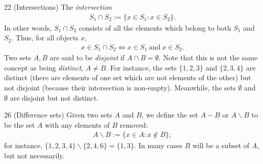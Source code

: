\begin{definition}{22}
    \label{set-intersection}
    (Intersections) The \emph{intersection} \begin{align*}
        S_1\cap S_2 := \{x\in S_1:x\in S_2\}.
    \end{align*}
    In other words, $S_1\cap S_2$ consists of all the elements which belong to both $S_1$ and $S_2$. Thus, for all objects $x$,\begin{align*}
        x\in S_1\cap S_2 \iff x\in S_1~\text{and}~x\in S_2.
    \end{align*}
    Two sets $A,B$ are said to be \emph{disjoint} if $A\cap B=\emptyset$. Note that this is not the same concept as being \emph{distinct}, $A\neq B$. For instance, the sets $\{1,2,3\}$ and $\{2,3,4\}$ are distinct (there are elements of one set which are not elements of the other) but not disjoint (because their intersection is non-empty). Meanwhile, the sets $\emptyset$ and $\emptyset$ are disjoint but not distinct.
\end{definition}

\begin{definition}{26}
    \label{set-difference}
    (Difference sets) Given two sets $A$ and $B$, we define the set $A-B$ or $A\backslash B$ to be the set $A$ with any elements of $B$ removed:\begin{align*}
        A\backslash B:=\{x\in A:x\notin B\};
    \end{align*}
    for instance, $\{1,2,3,4\}\backslash \{2,4,6\}=\{1,3\}$. In many cases $B$ will be a subset of $A$, but not necessarily.
\end{definition}

